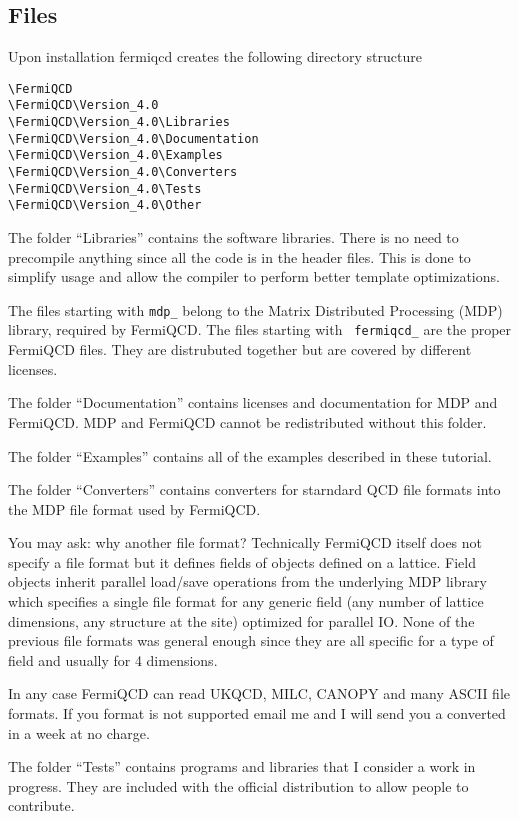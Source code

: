 \subsection{Files}

Upon installation fermiqcd creates the following directory structure
\begin{verbatim}
\FermiQCD
\FermiQCD\Version_4.0
\FermiQCD\Version_4.0\Libraries
\FermiQCD\Version_4.0\Documentation
\FermiQCD\Version_4.0\Examples
\FermiQCD\Version_4.0\Converters
\FermiQCD\Version_4.0\Tests
\FermiQCD\Version_4.0\Other
\end{verbatim}

The folder ``Libraries'' contains the software libraries. There is no need
to precompile anything since all the code is in the header files. This is
done to simplify usage and allow the compiler to perform better template
optimizations.

The files starting with {\tt mdp\_} belong to the Matrix Distributed
Processing (MDP) library, required by FermiQCD. The files starting with {\tt %
fermiqcd\_} are the proper FermiQCD files. They are distrubuted together but
are covered by different licenses.

The folder ``Documentation'' contains licenses and documentation for MDP and
FermiQCD. MDP and FermiQCD cannot be redistributed without this folder.

The folder ``Examples'' contains all of the examples described in these
tutorial.

The folder ``Converters'' contains converters for starndard QCD file formats
into the MDP file format used by FermiQCD.

You may ask: why another file format? Technically FermiQCD itself does not
specify a file format but it defines fields of objects defined on a lattice.
Field objects inherit parallel load/save operations from the underlying MDP
library which specifies a single file format for any generic field (any
number of lattice dimensions, any structure at the site) optimized for
parallel IO. None of the previous file formats was general enough since they
are all specific for a type of field and usually for 4 dimensions.

In any case FermiQCD can read UKQCD, MILC, CANOPY and many ASCII file
formats. If you format is not supported email me and I will send you a
converted in a week at no charge.

The folder ``Tests'' contains programs and libraries that I consider a work
in progress. They are included with the official distribution to allow
people to contribute.


